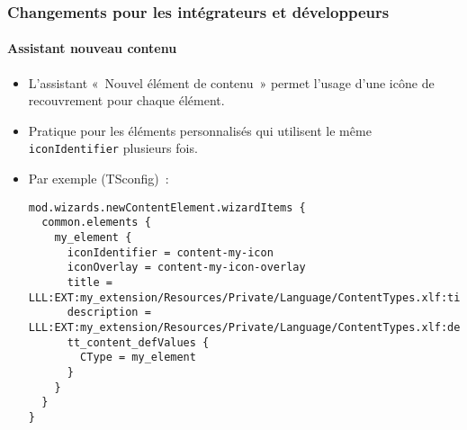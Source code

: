 %

\begin{frame}[fragile]
	\frametitle{Changements pour les intégrateurs et développeurs}
	\framesubtitle{Assistant nouveau contenu}


	\begin{itemize}
		\item L'assistant «~Nouvel élément de contenu~» permet l'usage d'une icône de recouvrement
			pour chaque élément.
		\item Pratique pour les éléments personnalisés qui utilisent le même
			\texttt{iconIdentifier} plusieurs fois.
		\item Par exemple (TSconfig)~:
\begin{lstlisting}
mod.wizards.newContentElement.wizardItems {
  common.elements {
    my_element {
      iconIdentifier = content-my-icon
      iconOverlay = content-my-icon-overlay
      title = LLL:EXT:my_extension/Resources/Private/Language/ContentTypes.xlf:title
      description = LLL:EXT:my_extension/Resources/Private/Language/ContentTypes.xlf:description
      tt_content_defValues {
        CType = my_element
      }
    }
  }
}
\end{lstlisting}

	\end{itemize}

\end{frame}

